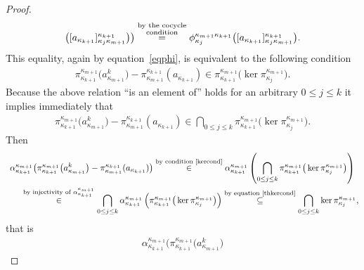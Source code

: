 \documentclass[11pt]{article}
\begin{document}
\begin{proof}
\begin{gather*}
 \big([a_{\kappa_{k+1}}]^{\kappa_{k+1}}_{\kappa_j\kappa_{m+1}}
\big) \big)
\overset{\substack{\text{by the cocycle} \\ \text{condition\vphantom{q}}}}{=} \phi^{\kappa_{m+1}\kappa_{k+1}}_{\kappa_j}\big([a_{\kappa_{k+1}}]^{\kappa_{k+1}}_{\kappa_j\kappa_{m+1}}\big).
\end{gather*}
This equality, again by equation~\eqref{eqphi}, is equivalent to the following condition
\begin{gather*}
\pi^{\kappa_{m+1}}_{\kappa_{k+1}}\big(a^k_{\kappa_{m+1}}\big)-\pi^{\kappa_{k+1}}_{\kappa_{m+1}}(a_{\kappa_{k+1}})
\in\pi^{\kappa_{m+1}}_{\kappa_{k+1}}\big(\ker\pi^{\kappa_{m+1}}_{\kappa_j}\big).
\end{gather*}
Because the above relation ``is an element of'' holds for an arbitrary $0\leq j\leq k$ it implies immediately that
\begin{gather}
\label{kercond}
\pi^{\kappa_{m+1}}_{\kappa_{k+1}}\big(a^k_{\kappa_{m+1}}\big)-\pi^{\kappa_{k+1}}_{\kappa_{m+1}}(a_{\kappa_{k+1}})
\in\bigcap_{0\leq j\leq k}\pi^{\kappa_{m+1}}_{\kappa_{k+1}}\big(\ker\pi^{\kappa_{m+1}}_{\kappa_j}\big).
\end{gather}
Then
\begin{gather*}
\alpha^{\kappa_{m+1}}_{\kappa_{k+1}}\big(\pi^{\kappa_{m+1}}_{\kappa_{k+1}}\big(a^k_{\kappa_{m+1}}\big)
-\pi^{\kappa_{k+1}}_{\kappa_{m+1}}(a_{\kappa_{k+1}})\big)
\overset{\text{by condition~\eqref{kercond}}}{\in}
\alpha^{\kappa_{m+1}}_{\kappa_{k+1}}\left(\bigcap_{0\leq j\leq k}\pi^{\kappa_{m+1}}_{\kappa_{k+1}}\big(\ker\pi^{\kappa_{m+1}}_{\kappa_j}\big) \right)
\\
\qquad
\overset{\text{by injectivity of $\alpha^{\kappa_{m+1}}_{\kappa_{k+1}}$}}{\in}
\bigcap_{0\leq j\leq k}
\alpha^{\kappa_{m+1}}_{\kappa_{k+1}}\left(\pi^{\kappa_{m+1}}_{\kappa_{k+1}}\big(\ker\pi^{\kappa_{m+1}}_{\kappa_j}\big)\right)
\overset{\text{by equation~\eqref{thkercond}}}{\subseteq}
\bigcap_{0\leq j\leq k}\ker\pi^{\kappa_{m+1}}_{\kappa_j},
\end{gather*}
that is
\begin{gather*}
\alpha^{\kappa_{m+1}}_{\kappa_{k+1}}\big(\pi^{\kappa_{m+1}}_{\kappa_{k+1}}\big(a^k_{\kappa_{m+1}}\big)

\end{gather*}
\end{proof}
\end{document}

